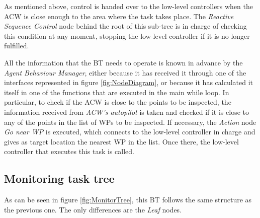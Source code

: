 As mentioned above, control is handed over to the low-level controllers when the \gls{ACW} is close enough to the area where the task takes place. The \emph{Reactive Sequence Control} node behind the root of this sub-tree is in charge of checking this condition at any moment, stopping the low-level controller if it is no longer fulfilled.

All the information that the BT needs to operate is known in advance by the \emph{Agent Behaviour Manager}, either because it has received it through one of the interfaces represented in figure \ref{fig:NodeDiagram}, or because it has calculated it itself in one of the functions that are executed in the main while loop. In particular, to check if the \gls{ACW} is close to the points to be inspected, the information received from \emph{\gls{ACW}'s autopilot} is taken and checked if it is close to any of the points in the list of \glspl{WP} to be inspected. If necessary, the \emph{Action} node \emph{Go near \gls{WP}} is executed, which connects to the low-level controller in charge and gives as target location the nearest \gls{WP} in the list. Once there, the low-level controller that executes this task is called.

\subsection{Monitoring task tree}
\label{sec:MonitoringTaskTree}
As can be seen in figure \ref{fig:MonitorTree}, this \gls{BT} follows the same structure as the previous one. The only differences are the \emph{Leaf} nodes.

